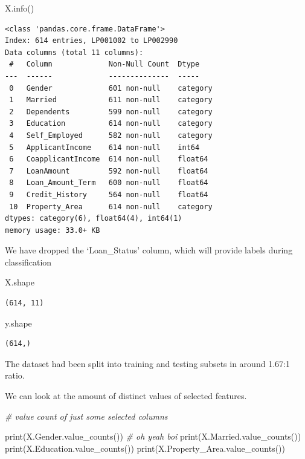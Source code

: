 \documentclass[]{article}
\newenvironment{Shaded}{}{}
\newcommand{\BuiltInTok}[1]{#1}
\newcommand{\CommentTok}[1]{\textcolor[rgb]{0.38,0.63,0.69}{\textit{#1}}}
\newcommand{\NormalTok}[1]{#1}
\begin{document}
\begin{Shaded}
\begin{Highlighting}[]
\NormalTok{X.info()}
\end{Highlighting}
\end{Shaded}

\begin{verbatim}
<class 'pandas.core.frame.DataFrame'>
Index: 614 entries, LP001002 to LP002990
Data columns (total 11 columns):
 #   Column             Non-Null Count  Dtype   
---  ------             --------------  -----   
 0   Gender             601 non-null    category
 1   Married            611 non-null    category
 2   Dependents         599 non-null    category
 3   Education          614 non-null    category
 4   Self_Employed      582 non-null    category
 5   ApplicantIncome    614 non-null    int64   
 6   CoapplicantIncome  614 non-null    float64 
 7   LoanAmount         592 non-null    float64 
 8   Loan_Amount_Term   600 non-null    float64 
 9   Credit_History     564 non-null    float64 
 10  Property_Area      614 non-null    category
dtypes: category(6), float64(4), int64(1)
memory usage: 33.0+ KB
\end{verbatim}

We have dropped the `Loan\_Status' column, which will provide labels
during classification

\begin{Shaded}
\begin{Highlighting}[]
\NormalTok{X.shape}
\end{Highlighting}
\end{Shaded}

\begin{verbatim}
(614, 11)
\end{verbatim}

\begin{Shaded}
\begin{Highlighting}[]
\NormalTok{y.shape}
\end{Highlighting}
\end{Shaded}

\begin{verbatim}
(614,)
\end{verbatim}

The dataset had been split into training and testing subsets in around
1.67:1 ratio.

We can look at the amount of distinct values of selected features.

\begin{Shaded}
\begin{Highlighting}[]
\CommentTok{# value count of just some selected columns}

\BuiltInTok{print}\NormalTok{(X.Gender.value_counts()) }\CommentTok{# oh yeah boi}
\BuiltInTok{print}\NormalTok{(X.Married.value_counts())}
\BuiltInTok{print}\NormalTok{(X.Education.value_counts())}
\BuiltInTok{print}\NormalTok{(X.Property_Area.value_counts())}
\end{Highlighting}
\end{Shaded}
\end{document}
